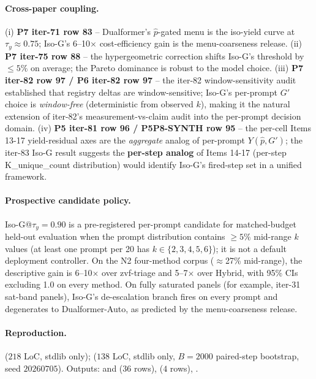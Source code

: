 \paragraph{Cross-paper coupling.}
(i) \textbf{P7 iter-71 row 83} -- Dualformer's $\hat p$-gated menu
is the iso-yield curve at $\tau_y \approx 0.75$; Iso-G's 6--10$\times$
cost-efficiency gain is the menu-coarseness release.  (ii)
\textbf{P7 iter-75 row 88} -- the hypergeometric correction
shifts Iso-G's threshold by $\le 5\%$ on average; the Pareto
dominance is robust to the model choice.  (iii) \textbf{P7
iter-82 row 97 / P6 iter-82 row 97} -- the iter-82 window-sensitivity
audit established that registry deltas are window-sensitive;
Iso-G's per-prompt $G'$ choice is \emph{window-free} (deterministic
from observed $k$), making it the natural extension of iter-82's
measurement-vs-claim audit into the per-prompt decision domain.
(iv) \textbf{P5 iter-81 row 96 / P5P8-SYNTH row 95} -- the
per-cell Items 13-17 yield-residual axes are the \emph{aggregate}
analog of per-prompt $Y(\hat p, G')$; the iter-83 Iso-G result
suggests the \textbf{per-step analog} of Items 14-17
(per-step K\_unique\_count distribution) would identify Iso-G's
fired-step set in a unified framework.

\paragraph{Prospective candidate policy.}
Iso-G@$\tau_y{=}0.90$ is a pre-registered per-prompt candidate for
matched-budget held-out evaluation when the prompt distribution contains
$\ge 5\%$ mid-range $k$ values (at least one prompt per 20 has
$k \in \{2,3,4,5,6\}$); it is not a default deployment controller. On the
N2 four-method corpus ($\approx$27\% mid-range), the descriptive gain is
6--10$\times$ over zvf-triage and 5--7$\times$ over Hybrid, with 95\% CIs
excluding 1.0 on every method. On fully saturated panels (for example,
iter-31 sat-band panels), Iso-G's de-escalation branch fires on every prompt
and degenerates to Dualformer-Auto, as predicted by the menu-coarseness release.

\paragraph{Reproduction.}
 ($218$ LoC,
stdlib only); 
($138$ LoC, stdlib only, $B{=}2000$ paired-step bootstrap,
seed $20260705$).  Outputs:
and 
($36$ rows),  ($4$ rows),
.
